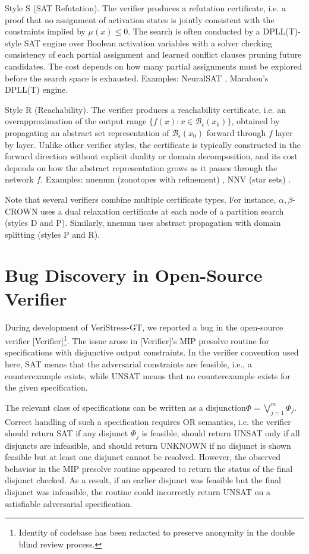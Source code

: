 \documentclass{article}
\theoremstyle{definition}
\begin{document}
Style S (SAT Refutation). The verifier produces a refutation certificate, i.e. a proof that no assignment of  activation states is jointly consistent with the constraints implied by $\mu(x) \leq 0$. The search is often conducted by a DPLL(T)-style SAT engine \cite{10.1007/978-3-540-27813-9_14} over Boolean activation variables with a solver checking consistency of each partial assignment and learned conflict clauses pruning future candidates. The cost depends on how many partial assignments must be explored before the search space is exhausted. Examples: NeuralSAT \cite{duong2024dplltframeworkverifyingdeep}, Marabou's DPLL(T) engine. 

Style R (Reachability). The verifier produces a reachability certificate, i.e. an overapproximation of the output range $\{f(x) : x \in \mathcal{B}_\epsilon(x_0)\}$, obtained by propagating an abstract set representation of $\mathcal{B}_\epsilon(x_0)$ forward through $f$ layer by layer. Unlike other verifier styles, the certificate is typically constructed in the forward direction without explicit duality or domain decomposition, and its cost depends on how the abstract representation grows as it passes through the network $f$. Examples: nnenum (zonotopes with refinement) \cite{nnenum}, NNV (star sets) \cite{tran2020nnvneuralnetworkverification}.

Note that several verifiers combine multiple certificate types. For instance, $\alpha,\beta$-CROWN uses a dual relaxation certificate at each node of a partition search (styles D and P). Similarly, nnenum uses abstract propagation with domain splitting (styles P and R).

\section{Bug Discovery in Open-Source Verifier}\label{app:NeuralSAT_Bug}

During development of VeriStress-GT, we reported a bug in the open-source verifier [Verifier]\footnote{Identity of codebase has been redacted to preserve anonymity in the double blind review process.}. The issue arose in [Verifier]'s MIP presolve routine for specifications with disjunctive output constraints. In the verifier convention used here, SAT means that the adversarial constraints are feasible, i.e., a counterexample exists, while UNSAT means that no counterexample exists for the given specification.

The relevant class of specifications can be written as a disjunction$\Phi = \bigvee_{j=1}^{m} \Phi_j$. 
Correct handling of such a specification requires OR semantics, i.e. the verifier should return SAT if any disjunct $\Phi_j$ is feasible, should return UNSAT only if all disjuncts are infeasible, and should return UNKNOWN if no disjunct is shown feasible but at least one disjunct cannot be resolved. However, the observed behavior in the MIP presolve routine appeared to return the status of the final disjunct checked. As a result, if an earlier disjunct was feasible but the final disjunct was infeasible, the routine could incorrectly return UNSAT on a satisfiable adversarial specification.
\end{document}
